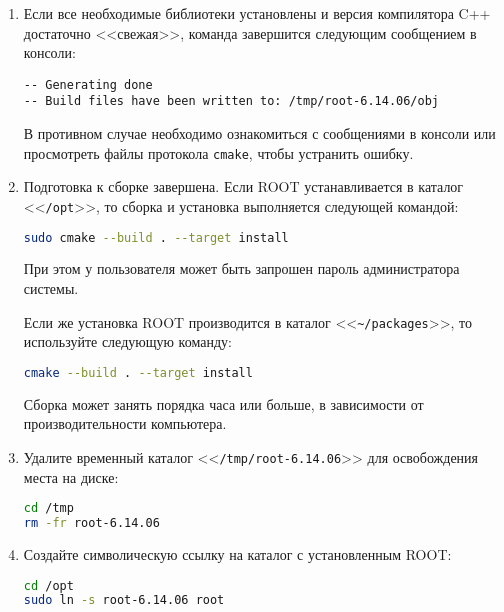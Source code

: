 \documentclass[12pt, a4paper, oneside, onecolumn]{book}
\newcommand{\ROOT}{\mbox{ROOT}}
\newcommand{\APP}[1]{\mbox{\tt #1}}
\newcommand{\DIRECTORY}[1]{<<{\tt #1}>>}
\begin{document}
\begin{enumerate}
\begin{lstlisting}[language=bash]
cmake -Dxml=ON -Dhttp=ON \
  -DCMAKE_INSTALL_PREFIX=~/packages/root-6.14.06 ..
\end{lstlisting}

\item Если все необходимые библиотеки установлены и версия компилятора C++ достаточно <<свежая>>, команда завершится следующим сообщением в консоли:

\begin{lstlisting}
-- Generating done
-- Build files have been written to: /tmp/root-6.14.06/obj
\end{lstlisting}

В противном случае необходимо ознакомиться с сообщениями в консоли или просмотреть файлы протокола \APP{cmake}, чтобы устранить ошибку.

\item Подготовка к сборке завершена. Если \ROOT{} устанавливается в каталог \DIRECTORY{/opt}, то сборка и установка выполняется следующей командой:

\begin{lstlisting}[language=bash]
sudo cmake --build . --target install
\end{lstlisting}

При этом у пользователя может быть запрошен пароль администратора системы.

Если же установка \ROOT{} производится в каталог \DIRECTORY{\~{}/packages}, то используйте следующую команду:

\begin{lstlisting}[language=bash]
cmake --build . --target install
\end{lstlisting}
 
Сборка может занять порядка часа или больше, в зависимости от производительности компьютера.

\item Удалите временный каталог \DIRECTORY{/tmp/root-6.14.06} для освобождения места на диске:

\begin{lstlisting}[language=bash]
cd /tmp
rm -fr root-6.14.06
\end{lstlisting}

\item Создайте символическую ссылку на каталог с установленным \ROOT{}:
\label{item-root-symlink}

\begin{lstlisting}[language=bash]
cd /opt
sudo ln -s root-6.14.06 root
\end{lstlisting}


\end{enumerate}
\end{document}
